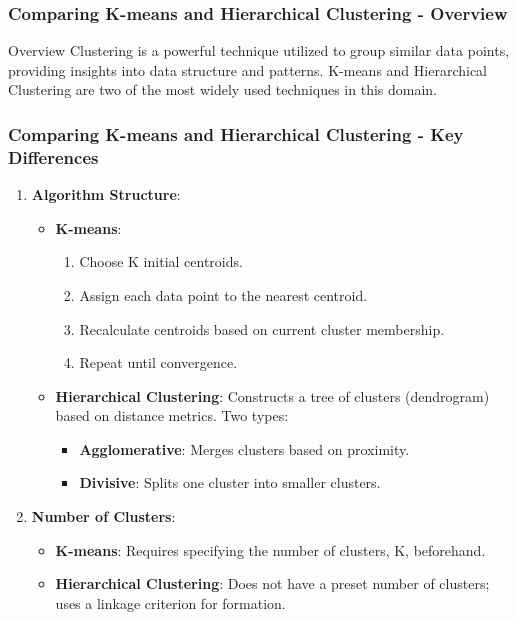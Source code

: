 \documentclass[aspectratio=169]{beamer}
\begin{document}
\begin{frame}[fragile]
    \frametitle{Comparing K-means and Hierarchical Clustering - Overview}
    \begin{block}{Overview}
        Clustering is a powerful technique utilized to group similar data points, providing insights into data structure and patterns. 
        K-means and Hierarchical Clustering are two of the most widely used techniques in this domain.
    \end{block}
\end{frame}

\begin{frame}[fragile]
    \frametitle{Comparing K-means and Hierarchical Clustering - Key Differences}
    \begin{enumerate}
        \item \textbf{Algorithm Structure}:
        \begin{itemize}
            \item \textbf{K-means}: 
            \begin{enumerate}
                \item Choose K initial centroids.
                \item Assign each data point to the nearest centroid.
                \item Recalculate centroids based on current cluster membership.
                \item Repeat until convergence.
            \end{enumerate}
            \item \textbf{Hierarchical Clustering}: Constructs a tree of clusters (dendrogram) based on distance metrics. Two types:
            \begin{itemize}
                \item \textbf{Agglomerative}: Merges clusters based on proximity.
                \item \textbf{Divisive}: Splits one cluster into smaller clusters.
            \end{itemize}
        \end{itemize}
        
        \item \textbf{Number of Clusters}:
        \begin{itemize}
            \item \textbf{K-means}: Requires specifying the number of clusters, K, beforehand.
            \item \textbf{Hierarchical Clustering}: Does not have a preset number of clusters; uses a linkage criterion for formation.
        \end{itemize}
        

\end{enumerate}
\end{frame}
\end{document}

